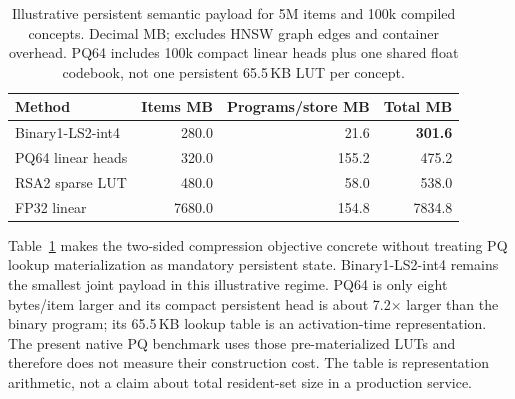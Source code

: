 \begin{table}[t]
\centering
\caption{Illustrative persistent semantic payload for 5M items and 100k compiled concepts. Decimal MB; excludes HNSW graph edges and container overhead. PQ64 includes 100k compact linear heads plus one shared float codebook, not one persistent 65.5\,KB LUT per concept.}
\label{tab:vocabmemory}
\small
\begin{tabular}{lrrr}
\toprule
Method & Items MB & Programs/store MB & Total MB\\
\midrule
Binary1-LS2-int4 & 280.0 & 21.6 & \textbf{301.6}\\
PQ64 linear heads & 320.0 & 155.2 & 475.2\\
RSA2 sparse LUT & 480.0 & 58.0 & 538.0\\
FP32 linear & 7680.0 & 154.8 & 7834.8\\
\bottomrule
\end{tabular}
\end{table}

Table~\ref{tab:vocabmemory} makes the two-sided compression objective concrete without treating PQ lookup materialization as mandatory persistent state. Binary1-LS2-int4 remains the smallest joint payload in this illustrative regime. PQ64 is only eight bytes/item larger and its compact persistent head is about 7.2$\times$ larger than the binary program; its 65.5\,KB lookup table is an activation-time representation. The present native PQ benchmark uses those pre-materialized LUTs and therefore does not measure their construction cost. The table is representation arithmetic, not a claim about total resident-set size in a production service.

